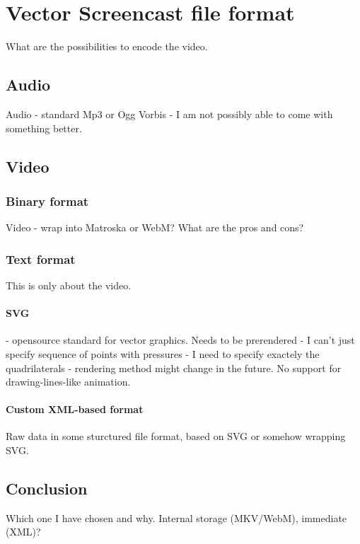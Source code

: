 \chapter{Vector Screencast file format}
What are the possibilities to encode the video.

\section{Audio}
Audio - standard Mp3 or Ogg Vorbis - I am not possibly able to come with something better.

\section{Video}
\subsection{Binary format}
Video - wrap into Matroska or WebM? What are the pros and cons?

\subsection{Text format}
This is only about the video.

\subsubsection{SVG}
- opensource standard for vector graphics.
Needs to be prerendered - I can't just specify sequence of points with pressures - I need to specify exactely the quadrilaterals - rendering method might change in the future.
No support for drawing-lines-like animation.

\subsubsection{Custom XML-based format}
Raw data in some sturctured file format, based on SVG or somehow wrapping SVG.

\section{Conclusion}
Which one I have chosen and why. Internal storage (MKV/WebM), immediate (XML)?